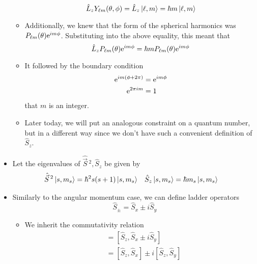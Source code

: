 \documentclass[../notes.tex]{subfiles}
\begin{document}
\begin{itemize}
\begin{itemize}
        \begin{equation*}
            \hat{L}_zY_{\ell m}(\theta,\phi) = \hat{L}_z\ket{\ell,m}
            = \hbar m\ket{\ell,m}
        \end{equation*}
        \item Additionally, we knew that the form of the spherical harmonics was $P_{\ell m}(\theta)\e[im\phi]$. Substituting into the above equality, this meant that
        \begin{equation*}
            \hat{L}_zP_{\ell m}(\theta)\e[im\phi] = \hbar mP_{\ell m}(\theta)\e[im\phi]
        \end{equation*}
        \item It followed by the boundary condition
        \begin{align*}
            \e[im(\phi+2\pi)] &= \e[im\phi]\\
            \e[2\pi im] &= 1
        \end{align*}
        that $m$ is an integer.
        \item Later today, we will put an analogous constraint on a quantum number, but in a different way since we don't have such a convenient definition of $\hat{S}_z$.
    \end{itemize}
    \item Let the eigenvalues of $\hat{\vec{S}}{\,}^2,\hat{S}_z$ be given by
    \begin{align*}
        \hat{\vec{S}}{\,}^2\ket{s,m_s} &= \hbar^2s(s+1)\ket{s,m_s}&
        \hat{S}_z\ket{s,m_s} &= \hbar m_s\ket{s,m_s}&
    \end{align*}
    \item Similarly to the angular momentum case, we can define ladder operators
    \begin{equation*}
        \hat{S}_\pm = \hat{S}_x\pm i\hat{S}_y
    \end{equation*}
    \begin{itemize}
        \item We inherit the commutativity relation
        \begin{align*}
            [\hat{S}_z,\hat{S}_\pm] &= [\hat{S}_z,\hat{S}_x\pm i\hat{S}_y]\\
            &= [\hat{S}_z,\hat{S}_x]\pm i[\hat{S}_z,\hat{S}_y]\tag*{Rule 4}\\

\end{align*}
\end{itemize}
\end{itemize}
\end{document}
